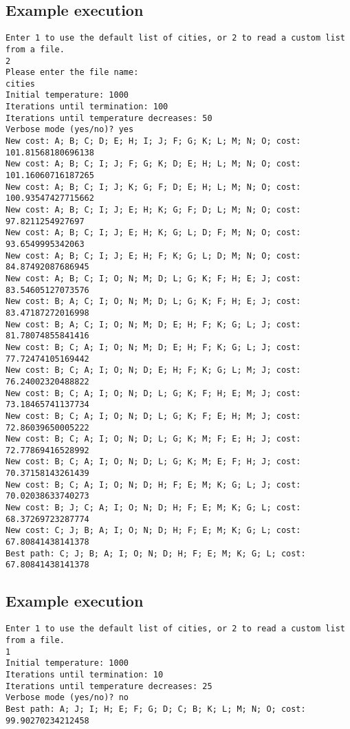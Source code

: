 \documentclass[a4paper]{article}
\begin{document}
\subsection*{Example execution}
\begin{verbatim}
Enter 1 to use the default list of cities, or 2 to read a custom list from a file.
2
Please enter the file name:
cities
Initial temperature: 1000
Iterations until termination: 100
Iterations until temperature decreases: 50
Verbose mode (yes/no)? yes
New cost: A; B; C; D; E; H; I; J; F; G; K; L; M; N; O; cost: 101.81568180696138
New cost: A; B; C; I; J; F; G; K; D; E; H; L; M; N; O; cost: 101.16060716187265
New cost: A; B; C; I; J; K; G; F; D; E; H; L; M; N; O; cost: 100.93547427715662
New cost: A; B; C; I; J; E; H; K; G; F; D; L; M; N; O; cost: 97.8211254927697
New cost: A; B; C; I; J; E; H; K; G; L; D; F; M; N; O; cost: 93.6549995342063
New cost: A; B; C; I; J; E; H; F; K; G; L; D; M; N; O; cost: 84.87492087686945
New cost: A; B; C; I; O; N; M; D; L; G; K; F; H; E; J; cost: 83.54605127073576
New cost: B; A; C; I; O; N; M; D; L; G; K; F; H; E; J; cost: 83.47187272016998
New cost: B; A; C; I; O; N; M; D; E; H; F; K; G; L; J; cost: 81.78074855841416
New cost: B; C; A; I; O; N; M; D; E; H; F; K; G; L; J; cost: 77.72474105169442
New cost: B; C; A; I; O; N; D; E; H; F; K; G; L; M; J; cost: 76.24002320488822
New cost: B; C; A; I; O; N; D; L; G; K; F; H; E; M; J; cost: 73.18465741137734
New cost: B; C; A; I; O; N; D; L; G; K; F; E; H; M; J; cost: 72.86039650005222
New cost: B; C; A; I; O; N; D; L; G; K; M; F; E; H; J; cost: 72.77869416528992
New cost: B; C; A; I; O; N; D; L; G; K; M; E; F; H; J; cost: 70.37158143261439
New cost: B; C; A; I; O; N; D; H; F; E; M; K; G; L; J; cost: 70.02038633740273
New cost: B; J; C; A; I; O; N; D; H; F; E; M; K; G; L; cost: 68.37269723287774
New cost: C; J; B; A; I; O; N; D; H; F; E; M; K; G; L; cost: 67.80841438141378
Best path: C; J; B; A; I; O; N; D; H; F; E; M; K; G; L; cost: 67.80841438141378
\end{verbatim}

\subsection*{Example execution}
\begin{verbatim}
Enter 1 to use the default list of cities, or 2 to read a custom list from a file.
1
Initial temperature: 1000
Iterations until termination: 10
Iterations until temperature decreases: 25
Verbose mode (yes/no)? no
Best path: A; J; I; H; E; F; G; D; C; B; K; L; M; N; O; cost: 99.90270234212458
\end{verbatim}
\end{document}
